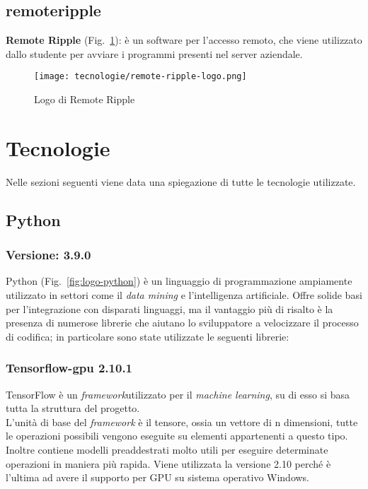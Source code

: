 \subsection{remoteripple}
\textbf{Remote Ripple} (Fig.~\ref{fig:logo-remoteripple}): è un software per l'accesso remoto, che viene utilizzato dallo studente per avviare i programmi presenti nel server aziendale.
    
\begin{figure}[!h] 
    \centering 
    \texttt{[image: tecnologie/remote-ripple-logo.png]} 
    \caption{Logo di Remote Ripple}
    \label{fig:logo-remoteripple}
  \end{figure}


\newpage

\section{Tecnologie}
\label{sec:tecnologie-strumenti}

Nelle sezioni seguenti viene data una spiegazione di tutte le tecnologie utilizzate.

\subsection{Python}

\subsubsection{Versione: 3.9.0}
Python (Fig.~\ref{fig:logo-python}) è un linguaggio di programmazione ampiamente utilizzato in settori come il \emph{data mining} e l'intelligenza artificiale. 
Offre solide basi per l'integrazione con disparati linguaggi, ma il vantaggio più di risalto è la presenza di numerose librerie che aiutano lo sviluppatore a velocizzare il processo di codifica; in particolare sono state utilizzate le seguenti librerie:

\subsubsection{\label{tec:tensorflow}Tensorflow-gpu 2.10.1}

TensorFlow è un \emph{\gls{framework}}\glsfirstoccur utilizzato per il \emph{machine learning}, su di esso si basa tutta la struttura del progetto.\\
L'unità di base del \emph{\gls{framework}} è il tensore, ossia un vettore di n dimensioni, tutte le operazioni possibili vengono eseguite su elementi appartenenti a questo tipo.
Inoltre contiene modelli preaddestrati molto utili per eseguire determinate operazioni in maniera più rapida. 
Viene utilizzata la versione 2.10 perché è l'ultima ad avere il supporto per GPU su sistema operativo Windows.


